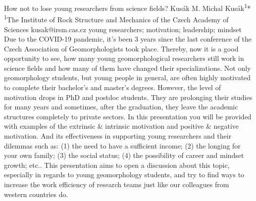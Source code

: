 
\abstract
{How not to lose young researchers from science fields?} 
{Kusák M.} 
{Michal Kusák\textsuperscript{1}*} 
{\TLtag} 
{
	\textsuperscript{1}The Institute of Rock Structure and Mechanics of the Czech Academy of Sciences
}
{kusak@irsm.cas.cz}  %
{young researchers; motivation; leadership; mindset}
{Due to the COVID-19 pandemic, it’s been 3 years since the last conference of the Czech Association of Geomorphologists took place. Thereby, now it is a good opportunity to see, how many young geomorphological researchers still work in science fields and how many of them have changed their specializations. Not only geomorphology students, but young people in general, are often highly motivated to complete their bachelor's and master's degrees. However, the level of motivation drops in PhD and postdoc students. They are prolonging their studies for many years and sometimes, after the graduation, they leave the academic structures completely to private sectors. In this presentation you will be provided with examples of the extrinsic \& intrinsic motivation and positive \& negative motivation. And its effectiveness in supporting young researchers and their dilemmas such as: (1) the need to have a sufficient income; (2) the longing for your own family; (3) the social status; (4) the possibility of career and mindset growth; etc.. This presentation aims to open a discussion about this topic, especially in regards to young geomorphology students, and try to find ways to increase the work efficiency of research teams just like our colleagues from western countries do.
}
{
}

















